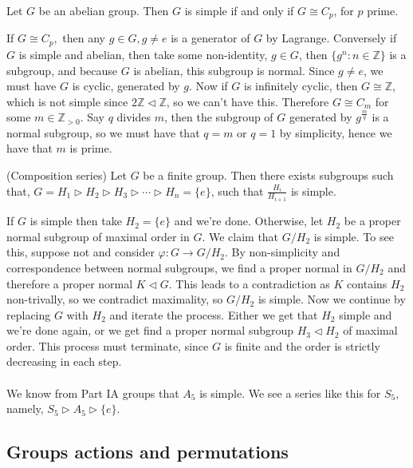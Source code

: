 \documentclass{article}
\newcommand{\nrm}{\triangleleft}
\begin{document}
\begin{itemize}
\begin{proposition}
  Let $ G $ be an abelian group. Then $ G $ is simple if and only if  $ G\cong C_p $, for $ p $ prime.
\end{proposition}
\pf If $ G\cong C_p, $ then any $ g\in G, g\ne e $ is a generator of $ G $ by Lagrange. Conversely if $ G $ is simple and abelian, then take some non-identity, $ g\in G $, then $ \{g^n :n\in \mathbb Z\} $ is a subgroup, and because $ G $ is abelian, this subgroup is normal. Since $ g\ne e $, we must have $ G $ is cyclic, generated by $ g $. Now if $ G $ is infinitely cyclic, then $ G\cong\mathbb Z $, which is not simple since $ 2\mathbb Z\nrm \mathbb Z $, so we can't have this. Therefore $ G\cong C_m $ for some $ m\in \mathbb Z_{>0} $. Say $ q $ divides $ m $, then the subgroup of $ G $ generated by $ g^{\frac mq} $ is a normal subgroup, so we must have that $ q=m $ or $ q=1 $ by simplicity, hence we have that $ m $ is prime.
\begin{theorem}
	(Composition series) Let $ G $ be a finite group. Then there exists subgroups such that, $ G=H_1\triangleright H_2\triangleright H_3\triangleright\cdots \triangleright H_n=\{e\} $, such that $ \frac {H_i}{H_{i+1}} $ is simple.
\end{theorem}
\pf If $ G $ is simple then take $ H_2=\{e\} $ and we're done. Otherwise, let $ H_2 $ be a proper normal subgroup of maximal order in $ G $. We claim that $ G/H_2 $ is simple. To see this, suppose not and consider $ \varphi: G\to G/H_2 $.
 By non-simplicity and correspondence between normal subgroups, we find a proper normal in $ G/H_2 $ and therefore a proper normal $ K\nrm G $. This leads to a contradiction as $ K $ contains $ H_2 $ non-trivally, so we contradict maximality, so $ G/H_2 $ is simple. Now we continue by replacing $ G $ with $ H_2 $ and iterate the process. Either we get that $ H_2 $ simple and we're done again, or we get find a proper normal subgroup $ H_3\nrm H_2 $ of maximal order. This process must terminate, since $ G $ is finite and the order is strictly decreasing in each step.\\\\
 We know from Part IA groups that $ A_5 $ is simple. We see a series like this for $ S_5 $, namely, $ S_5\triangleright A_5\triangleright \{e\} $.
 \subsection{Groups actions and permutations}


\end{itemize}
\end{document}

